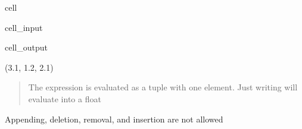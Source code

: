 \documentclass[letterpaper,10pt,english]{jupyterBook}
\begin{document}
\begin{sphinxuseclass}{cell}\begin{sphinxVerbatimInput}

\begin{sphinxuseclass}{cell_input}
\begin{sphinxVerbatim}[commandchars=\\\{\}]
  
\end{sphinxVerbatim}

\end{sphinxuseclass}\end{sphinxVerbatimInput}
\begin{sphinxVerbatimOutput}

\begin{sphinxuseclass}{cell_output}
\begin{sphinxVerbatim}[commandchars=\\\{\}]
(3.1, 1.2, 2.1)
\end{sphinxVerbatim}

\end{sphinxuseclass}\end{sphinxVerbatimOutput}

\end{sphinxuseclass}\begin{quote}

\sphinxAtStartPar
The expression  is evaluated as a tuple with one element. Just writing  will evaluate into a float
\end{quote}

\sphinxAtStartPar
Appending, deletion, removal, and insertion are not allowed
\end{document}
